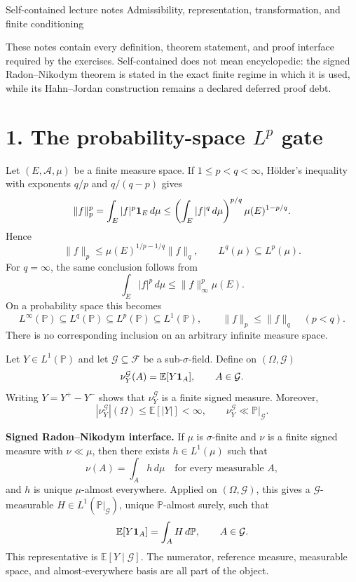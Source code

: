 \sheettitle
  {Self-contained lecture notes}
  {Admissibility, representation, transformation, and finite conditioning}

These notes contain every definition, theorem statement, and proof interface required by the exercises. Self-contained does not mean encyclopedic: the signed Radon--Nikodym theorem is stated in the exact finite regime in which it is used, while its Hahn--Jordan construction remains a declared deferred proof debt.

\section*{1. The probability-space $L^p$ gate}

Let $(E,\mathcal A,\mu)$ be a finite measure space. If $1\le p<q<\infty$, H\"older's inequality with exponents $q/p$ and $q/(q-p)$ gives
\[
\|f\|_p^p
=
\int_E |f|^p\mathbf 1_E\,d\mu
\le
\left(\int_E|f|^q\,d\mu\right)^{p/q}
\mu(E)^{1-p/q}.
\]
Hence
\[
\boxed{
\|f\|_p
\le
\mu(E)^{1/p-1/q}\|f\|_q
},
\qquad
L^q(\mu)\subseteq L^p(\mu).
\]
For $q=\infty$, the same conclusion follows from
\[
\int_E|f|^p\,d\mu
\le
\|f\|_\infty^p\mu(E).
\]
On a probability space this becomes
\[
L^\infty(\mathbb P)\subseteq L^q(\mathbb P)\subseteq L^p(\mathbb P)\subseteq L^1(\mathbb P),
\qquad
\|f\|_p\le\|f\|_q
\quad(p<q).
\]
There is no corresponding inclusion on an arbitrary infinite measure space.

Let $Y\in L^1(\mathbb P)$ and let $\mathcal G\subseteq\mathcal F$ be a sub-$\sigma$-field. Define on $(\Omega,\mathcal G)$
\[
\nu_Y^{\mathcal G}(A)
=
\mathbb E[Y\mathbf 1_A],
\qquad A\in\mathcal G.
\]
Writing $Y=Y^+-Y^-$ shows that $\nu_Y^{\mathcal G}$ is a finite signed measure. Moreover,
\[
|\nu_Y^{\mathcal G}|(\Omega)
\le
\mathbb E[|Y|]
<\infty,
\qquad
\nu_Y^{\mathcal G}\ll\mathbb P|_{\mathcal G}.
\]

\textbf{Signed Radon--Nikodym interface.}
If $\mu$ is $\sigma$-finite and $\nu$ is a finite signed measure with $\nu\ll\mu$, then there exists $h\in L^1(\mu)$ such that
\[
\nu(A)=\int_Ah\,d\mu
\quad\text{for every measurable }A,
\]
and $h$ is unique $\mu$-almost everywhere. Applied on $(\Omega,\mathcal G)$, this gives a $\mathcal G$-measurable $H\in L^1(\mathbb P|_{\mathcal G})$, unique $\mathbb P$-almost surely, such that
\[
\mathbb E[Y\mathbf 1_A]=\int_AH\,d\mathbb P,
\qquad A\in\mathcal G.
\]
This representative is $\mathbb E[Y\mid\mathcal G]$. The numerator, reference measure, measurable space, and almost-everywhere basis are all part of the object.

